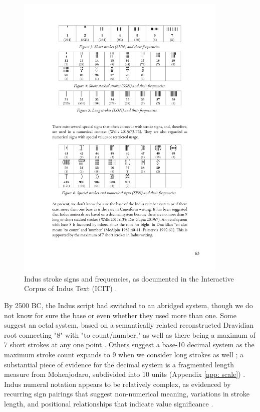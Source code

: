 \documentclass[11pt,a4paper,oneside]{report}
\begin{document}
\begin{figure}[H] 
    \centering
    \includegraphics[width=0.9\textwidth]{Images/Fuls.pdf}
    \caption [Indus Stroke Signs]{Indus stroke signs and frequencies, as documented in the Interactive Corpus of Indus Text (ICIT) \cite{fuls_ancient_2020, wells_interactive_2024}.}
    \label{fig:strokes}
\end{figure}

By 2500 BC, the Indus script had switched to an abridged system, though we do not know for sure the base or even whether they used more than one. Some suggest an octal system, based on a semantically related reconstructed Dravidian root connecting "8" with "to count/number," as well as there being a maximum of 7 short strokes at any one point \cite{fuls_ancient_2020, mcalpin_toward_1974, fairservis_harappan_1992}. Others suggest a base-10 decimal system as the maximum stroke count expands to 9 when we consider long strokes as well \cite{wells_epigraphic_2011}; a substantial piece of evidence for the decimal system is a fragmented length measure from Mohenjodaro, subdivided into 10 units (Appendix \ref{app: scale}) \cite{guha_history_2022, mackay_household_1938}. Indus numeral notation appears to be relatively complex, as evidenced by recurring sign pairings that suggest non-numerical meaning, variations in stroke length, and positional relationships that indicate value significance \cite{fuls_ancient_2020}. 
\end{document}
